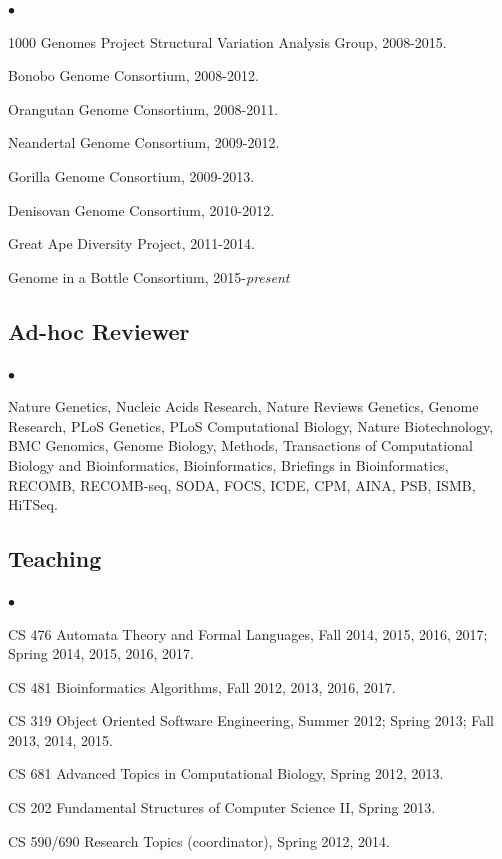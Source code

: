 \documentclass[margin,line]{res}
\newenvironment{list2}{
  \begin{list}{$\bullet$}{%
      \setlength{\itemsep}{0in}
      \setlength{\parsep}{0in} \setlength{\parskip}{0in}
      \setlength{\topsep}{0in} \setlength{\partopsep}{0in} 
      \setlength{\leftmargin}{0.2in}}}{\end{list}}
\begin{document}
\begin{resume}
\begin{list2}
\item
  1000 Genomes Project Structural Variation Analysis Group, 2008-2015.
\item
  Bonobo Genome Consortium, 2008-2012.
\item
  Orangutan Genome Consortium, 2008-2011.
\item
  Neandertal Genome Consortium, 2009-2012.
\item
  Gorilla Genome Consortium, 2009-2013.
\item
  Denisovan Genome Consortium, 2010-2012.
\item
  Great Ape Diversity Project, 2011-2014.
\item
  Genome in a Bottle Consortium, 2015-{\it present}
\end{list2}


\vspace{-0.4cm}
\subsection{\small \sc Ad-hoc Reviewer}
\begin{list2}
\item
  Nature Genetics, Nucleic Acids Research, Nature Reviews Genetics, Genome Research, PLoS Genetics, PLoS Computational Biology, 
  Nature Biotechnology, BMC Genomics, Genome Biology, Methods, Transactions of Computational Biology and Bioinformatics,
  Bioinformatics, Briefings in Bioinformatics, RECOMB, RECOMB-seq, SODA, FOCS, ICDE, CPM, AINA, PSB, ISMB, HiTSeq.
\end{list2}

\vspace{-0.4cm}
\subsection{\small \sc Teaching}
\begin{list2}
  \item CS 476 Automata Theory and Formal Languages, Fall 2014, 2015, 2016, 2017; Spring 2014, 2015, 2016, 2017. 
  \item CS 481 Bioinformatics Algorithms, Fall 2012, 2013, 2016, 2017.
  \item CS 319 Object Oriented Software Engineering, Summer 2012; Spring 2013; Fall 2013, 2014, 2015.
  \item CS 681 Advanced Topics in Computational Biology, Spring 2012, 2013.
  \item CS 202 Fundamental Structures of Computer Science II, Spring 2013.
  \item CS 590/690 Research Topics (coordinator), Spring 2012, 2014.
\end{list2}



\end{resume}
\end{document}
